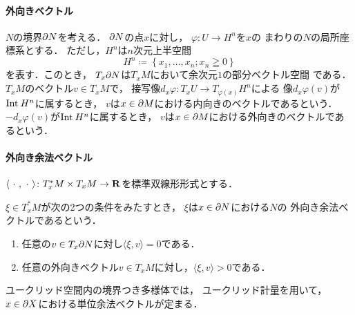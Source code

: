 \paragraph{外向きベクトル}
\(N\)の境界\(\mathord{\partial}{N}\)を考える．
\(\mathord{\partial}{N}\)の点\(x\)に対し，
\(\varphi\colon U\to H^n\)を\(x\)の
まわりの\(N\)の局所座標系とする．
ただし，\(H^n\)は\(n\)次元上半空間\[
  H^{n}\coloneqq\left\{
    x_{1},\ldots,x_{n};x_{n}\geqq0
  \right\}
\]を表す．このとき，
\(T_{x}\mathord{\partial}{N}\)は\(T_{x}M\)において余次元\(1\)の部分ベクトル空間
である．\(T_{x}M\)のベクトル\(v\in T_{x}M\)で，
接写像\(d_{x}\varphi\colon T_{x}U\to T_{\varphi(x)}H^n\)による
像\(d_{x}\varphi(v)\)が\(\mathop{\mathrm{Int}}\nolimits_{}{H^n}\)に属するとき，
\(v\)は\(x\in\mathord{\partial}{M}\)における内向きのベクトルであるという．
\(-d_{x}\varphi(v)\)が\(\mathop{\mathrm{Int}}\nolimits_{}{H^n}\)に属するとき，
\(v\)は\(x\in\mathord{\partial}{M}\)における外向きのベクトルであるという．

\paragraph{外向き余法ベクトル}
\(
  \langle\mathord{\ \cdot\ },\mathord{\ \cdot\ }\rangle\colon 
  T^{\ast}_{x}M\times T_{x}M\to\mathbf{R}
\)を標準双線形形式とする．
\begin{leftbar}
  \begin{DFN}
    \(\xi\in T_{x}^{\ast}M\)が次の2つの条件をみたすとき，
    \(\xi\)は\(x\in\mathord{\partial}{N}\)における\(N\)の
    外向き余法ベクトルであるという．
    \begin{enumerate}
      \item 任意の\(v\in T_{x}\mathord{\partial}{N}\)に対し\(\langle \xi,v\rangle=0\)である．
      \item 任意の外向きベクトル\(v\in T_{x}M\)に対し，\(\langle \xi,v\rangle>0\)である．
    \end{enumerate}  
  \end{DFN}    
\end{leftbar}

ユークリッド空間内の境界つき多様体では，
ユークリッド計量を用いて，\(x\in\mathord{\partial}{X}\)における単位余法ベクトルが定まる．

